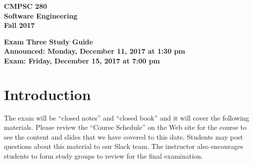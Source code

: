 \documentclass[11pt]{article}
\newcommand{\assignmentduedate}{December 15}
\newcommand{\assignmentassignedate}{December 11}
\newcommand{\assignmentnumber}{Three}
\newcommand{\labyear}{2017}
\newcommand{\assignedday}{Monday}
\newcommand{\dueday}{Friday}
\newcommand{\labtime}{7:00 pm}
\newcommand{\announcetime}{1:30 pm}
\newcommand{\assigneddate}{Announced: \assignedday, \assignmentassignedate, \labyear{} at \announcetime{}}
\newcommand{\duedate}{Exam: \dueday, \assignmentduedate, \labyear{} at \labtime{}}
\newcommand{\guidetitle}[1]
{
  \begin{center}
    \begin{center}
      \bf
      CMPSC 280\\Software Engineering\\
      Fall 2017\\
      \medskip
    \end{center}
    \bf
    #1
  \end{center}
}
\begin{document}
\thispagestyle{empty}

\guidetitle{Exam \assignmentnumber{} Study Guide \\ \assigneddate{} \\ \duedate{}}

\section*{Introduction}

\noindent
The exam will be ``closed notes'' and ``closed book'' and it will cover the
following materials. Please review the ``Course Schedule'' on the Web site for
the course to see the content and slides that we have covered to this date.
Students may post questions about this material to our Slack team. The
instructor also encourages students to form study groups to review for the
final examination.
\end{document}
